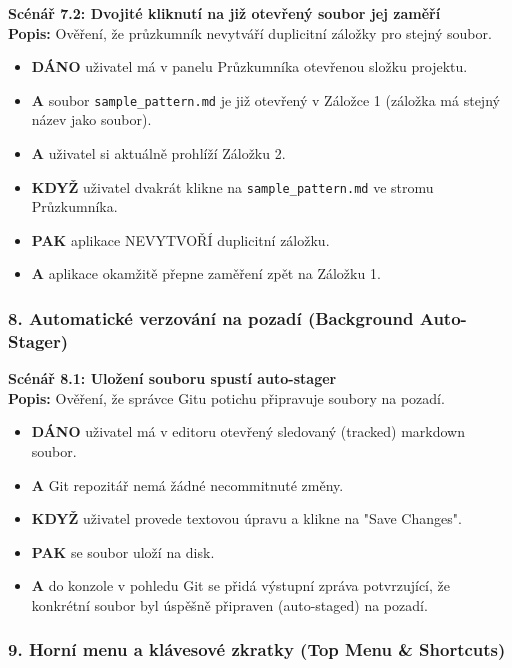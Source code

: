 \documentclass[12pt, a4paper]{article}
\begin{document}
\textbf{Scénář 7.2: Dvojité kliknutí na již otevřený soubor jej zaměří} \\
\textbf{Popis:} Ověření, že průzkumník nevytváří duplicitní záložky pro stejný soubor.
\begin{itemize}
    \item \textbf{DÁNO} uživatel má v panelu Průzkumníka otevřenou složku projektu.
    \item \textbf{A} soubor \texttt{sample\_pattern.md} je již otevřený v Záložce 1 (záložka má stejný název jako soubor).
    \item \textbf{A} uživatel si aktuálně prohlíží Záložku 2.
    \item \textbf{KDYŽ} uživatel dvakrát klikne na \texttt{sample\_pattern.md} ve stromu Průzkumníka.
    \item \textbf{PAK} aplikace NEVYTVOŘÍ duplicitní záložku.
    \item \textbf{A} aplikace okamžitě přepne zaměření zpět na Záložku 1.
\end{itemize}

\subsubsection*{8. Automatické verzování na pozadí (Background Auto-Stager)}

\textbf{Scénář 8.1: Uložení souboru spustí auto-stager} \\
\textbf{Popis:} Ověření, že správce Gitu potichu připravuje soubory na pozadí.
\begin{itemize}
    \item \textbf{DÁNO} uživatel má v editoru otevřený sledovaný (tracked) markdown soubor.
    \item \textbf{A} Git repozitář nemá žádné necommitnuté změny.
    \item \textbf{KDYŽ} uživatel provede textovou úpravu a klikne na "Save Changes".
    \item \textbf{PAK} se soubor uloží na disk.
    \item \textbf{A} do konzole v pohledu Git se přidá výstupní zpráva potvrzující, že konkrétní soubor byl úspěšně připraven (auto-staged) na pozadí.
\end{itemize}

\subsubsection*{9. Horní menu a klávesové zkratky (Top Menu \& Shortcuts)}
\end{document}

